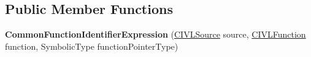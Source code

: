 \subsection*{Public Member Functions}
\begin{DoxyCompactItemize}
\item 
\hypertarget{classedu_1_1udel_1_1cis_1_1vsl_1_1civl_1_1model_1_1common_1_1expression_1_1CommonFunctionIdentifierExpression_a314807d8fa34d1439c9f9604b3d45650}{}{\bfseries Common\+Function\+Identifier\+Expression} (\hyperlink{interfaceedu_1_1udel_1_1cis_1_1vsl_1_1civl_1_1model_1_1IF_1_1CIVLSource}{C\+I\+V\+L\+Source} source, \hyperlink{interfaceedu_1_1udel_1_1cis_1_1vsl_1_1civl_1_1model_1_1IF_1_1CIVLFunction}{C\+I\+V\+L\+Function} function, Symbolic\+Type function\+Pointer\+Type)\label{classedu_1_1udel_1_1cis_1_1vsl_1_1civl_1_1model_1_1common_1_1expression_1_1CommonFunctionIdentifierExpression_a314807d8fa34d1439c9f9604b3d45650}


\end{DoxyCompactItemize}
